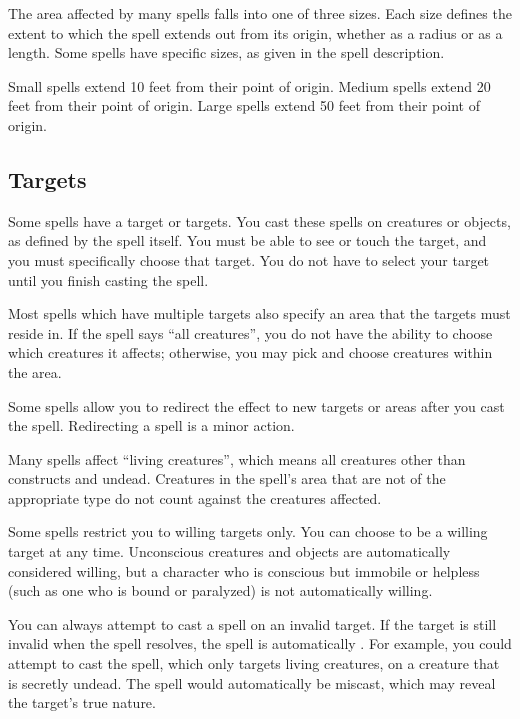             The area affected by many spells falls into one of three sizes.
            Each size defines the extent to which the spell extends out from its origin, whether as a radius or as a length.
            Some spells have specific sizes, as given in the spell description.

             Small spells extend 10 feet from their point of origin.
             Medium spells extend 20 feet from their point of origin.
             Large spells extend 50 feet from their point of origin.

    \subsection{Targets}
        Some spells have a target or targets.
        You cast these spells on creatures or objects, as defined by the spell itself.
        You must be able to see or touch the target, and you must specifically choose that target.
        You do not have to select your target until you finish casting the spell.

         Most spells which have multiple targets also specify an area that the targets must reside in.
        If the spell says ``all creatures'', you do not have the ability to choose which creatures it affects; otherwise, you may pick and choose creatures within the area.

         Some spells allow you to redirect the effect to new targets or areas after you cast the spell.
        Redirecting a spell is a minor action.

         Many spells affect ``living creatures'', which means all creatures other than constructs and undead.
        Creatures in the spell's area that are not of the appropriate type do not count against the creatures affected.

         Some spells restrict you to willing targets only.
        You can choose to be a willing target at any time.
        Unconscious creatures and objects are automatically considered willing, but a character who is conscious but immobile or helpless (such as one who is bound or paralyzed) is not automatically willing.

         You can always attempt to cast a spell on an invalid target.
        If the target is still invalid when the spell resolves, the spell is automatically .
        For example, you could attempt to cast the  spell, which only targets living creatures, on a creature that is secretly undead.
        The spell would automatically be miscast, which may reveal the target's true nature.

